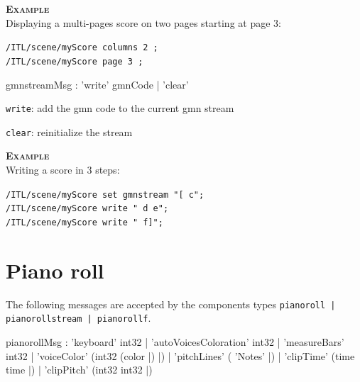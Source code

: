 \documentclass[a4paper,twoside]{report}
\newcommand{\sublevel}[1]	{\section{#1}}
\newcommand{\OSC}[1]		{\texttt{#1}}
\newcommand{\example}		{\textbf{\hspace{-1.5cm}\textbf{\textsc{Example }}}}
\let\olditemize\itemize
\let\oldenditemize\enditemize
\renewenvironment{itemize} 	{\olditemize \setlength{\itemsep}{1mm}}{\oldenditemize}
\newcommand{\sample}	[1]			{\vspace{-2mm}\begin{center}\colorbox{mygrey}{
								\begin{minipage}[t]{0.9\columnwidth} 
								{\small \texttt{#1}}
								\end{minipage}}\end{center}}
\begin{document}
\example \\
Displaying a multi-pages score on two pages starting at page 3:
\sample{/ITL/scene/myScore columns 2 ;\\
/ITL/scene/myScore page 3 ;
}


\begin{rail}
gmnstreamMsg :      'write' gmnCode
				| 'clear' 
\end{rail}

\begin{itemize}
\item \OSC{write}: add the gmn code to the current gmn stream
\item \OSC{clear}: reinitialize the stream
\end{itemize}


\example \\
Writing a score in 3 steps:
\sample{/ITL/scene/myScore set gmnstream "[ c"; \\
/ITL/scene/myScore write " d e";\\
/ITL/scene/myScore write " f]";
}


\sublevel{Piano roll}
\label{pianoroll}

The following messages are accepted by the components types \OSC{pianoroll | pianorollstream | pianorollf}.

\begin{rail}
pianorollMsg :		'keyboard' int32
			| 'autoVoicesColoration' int32
			| 'measureBars' int32
			| 'voiceColor' (int32 (color |) |)
			| 'pitchLines' ( 'Notes' |)
			| 'clipTime' (time time |)
			| 'clipPitch' (int32 int32 |)
\end{rail}
\end{document}
